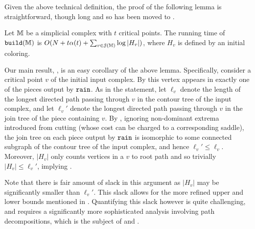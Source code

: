{Given the above technical definition, the proof of the following lemma is straightforward, though long and so has been moved to .

\begin{lemma}\label{lem:runTimeUpper}
Let $\mathbb{M}$ be a simplicial complex with $t$ critical points.  
The running time of ${\tt build}(\mathbb{M})$ is $O(N+t\alpha(t) + \sum_{v \in {\cal J}(\mathbb{M})} \log |H_v|)$, where $H_v$ is defined by an initial coloring.
\end{lemma}

Our main result, , is an easy corollary of the above lemma. Specifically, consider a critical point $v$ of the initial input 
complex.  By  this vertex appears in exactly one of the pieces output by ${\tt rain}$.  As in the  statement, let $\ell_v$ 
denote the length of the longest directed path passing through $v$ in the contour tree of the input complex, and let $\ell_v'$ 
denote the longest directed path passing through $v$ in the join tree of the piece containing $v$.
By , ignoring non-dominant extrema introduced from cutting (whose cost can be charged to a corresponding saddle), the join tree on each piece output by ${\tt rain}$ is isomorphic to some 
connected subgraph of the contour tree of the input complex, and hence $\ell_v'\leq \ell_v$.  
Moreover, $|H_v|$ only counts vertices in a $v$ to root path and so trivially $|H_v|\leq \ell_v'$, implying .

Note that there is fair amount of slack in this argument as $|H_v|$ may be significantly smaller than $\ell_v'$.  
This slack allows for the more refined upper and lower bounds mentioned in .  Quantifying this slack however is quite challenging, 
and requires a significantly more sophisticated analysis involving path decompositions, which is the subject of  and .







}
